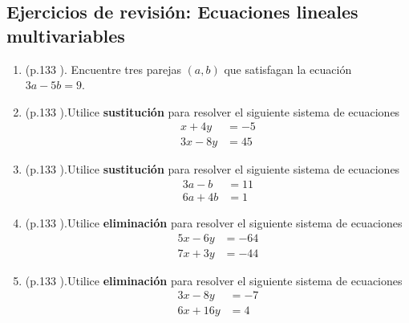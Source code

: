 \newpage
\begin{center}
	\vspace{-5mm}
	\section*{Ejercicios de revisión: Ecuaciones lineales multivariables }\label{section:label_section}
\end{center}

\begin{enumerate}
	\item (p.133 \cite{Aops_algebra}). Encuentre tres parejas $(a,b)$ que satisfagan la ecuación $3a-5b=9$.
	
	\item (p.133 \cite{Aops_algebra}).Utilice \textbf{sustitución} para resolver el siguiente sistema de ecuaciones
	\begin{align*}
	x+4y &= -5\\
	3x-8y&=45
	\end{align*}
	
	\item (p.133 \cite{Aops_algebra}).Utilice \textbf{sustitución} para resolver el siguiente sistema de ecuaciones
	\begin{align*}
	3a-b&= 11\\
	6a+4b&=1
	\end{align*}
	
	\item (p.133 \cite{Aops_algebra}).Utilice \textbf{eliminación} para resolver el siguiente sistema de ecuaciones
	\begin{align*}
	5x-6y &= -64\\
	7x+3y&= -44
	\end{align*}
	
	\item (p.133 \cite{Aops_algebra}).Utilice \textbf{eliminación} para resolver el siguiente sistema de ecuaciones
	\begin{align*}
	3x-8y &= -7\\
	6x+16y&= 4
	\end{align*}
\end{enumerate}
\newpage